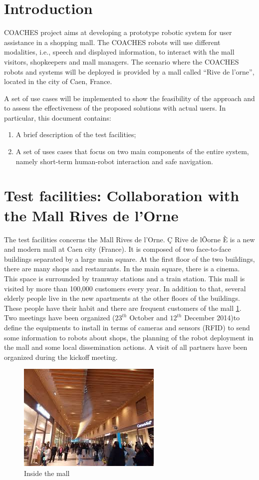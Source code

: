 \section{Introduction}

COACHES project aims at developing a prototype robotic system for user assistance in a shopping mall.
The COACHES robots will use different modalities, i.e., speech and displayed information,
to interact with the mall visitors, shopkeepers and mall managers.
The scenario where the COACHES robots and systems will be deployed is provided
by a mall called ``Rive de l’orne'', located in the city of Caen, France.

A set of use cases will be implemented to show the feasibility of the approach and to assess the effectiveness of the proposed solutions with actual users.
In particular, this document contains:
\begin{enumerate}
\item A brief description of the test facilities;
\item A set of uses cases that focus on two main components of the entire system,
namely short-term human-robot interaction and safe navigation.
\end{enumerate}

\section{Test facilities: Collaboration with the Mall Rives de l'Orne}
The test facilities concerns the Mall Rives de l'Orne. Ç Rive de lÕorne È is a new and modern mall at Caen city (France). It is composed of two face-to-face buildings separated by a large main square. At the first floor of the two buildings, there are many shops and restaurants. In the main square, there is a cinema. This space is surrounded by tramway stations and a train station. This mall is visited by more than 100,000 customers every year. In addition to that, several elderly people live in the new apartments at the other floors of the buildings. These people have their habit and there are frequent customers of the mall \ref{mall}. Two meetings have been organized ($23^{th}$ October and $12^{th}$ December 2014)to define the equipments to install in terms of cameras and sensors (RFID) to send some information to robots about shops, the planning of the robot deployment in the mall and some local dissemination actions. A visit of all partners have been organized during the kickoff meeting. 

\begin{figure}[!t]
\begin{center}
\includegraphics[width=0.42\linewidth]{InsideRivedelOrne}
\caption{Inside the mall}
\label{mall}
\end{center}
\end{figure}

